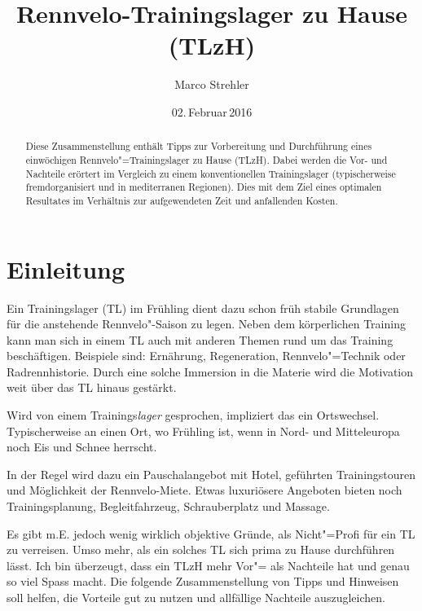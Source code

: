 \documentclass[a4paper,DIV13,BCOR0cm,draft=TRUE]{scrartcl}
\newcommand{\rv}{Rennvelo}
\newcommand{\tlzh}{TLzH}
\newcommand{\Tlzh}{Trainingslager zu Hause}
\begin{document}
\renewcommand*\contentsname{Inhalt} %
\renewcommand*\refname{Quellen} %

\lhead{\tlzh}

\title{\rv-\Tlzh{} (\tlzh)}
\author{Marco Strehler}

\date{02.\,Februar\,2016}

\maketitle

\begin{abstract}
Diese Zusammenstellung enthält Tipps zur Vorbereitung und Durchführung eines einwöchigen \rv"=Trainingslager zu Hause (\tlzh).
Dabei werden die Vor- und Nachteile erörtert im Vergleich zu einem konventionellen Trainingslager
(typischerweise fremdorganisiert und in mediterranen Regionen). 
Dies mit dem Ziel eines optimalen Resultates im Verhältnis zur aufgewendeten Zeit und anfallenden Kosten.
\end{abstract}

\tableofcontents
\section{Einleitung}

Ein Trainingslager (TL) im Frühling dient dazu
schon früh stabile Grundlagen für die anstehende \rv"-Saison zu legen.
Neben dem körperlichen Training kann man sich in einem TL auch mit anderen Themen rund um das Training beschäftigen.
Beispiele sind: Ernährung, Regeneration, \rv"=Technik oder Radrennhistorie.
Durch eine solche Immersion in die Materie wird die Motivation weit über das TL hinaus gestärkt.

Wird von einem Trainings\textsl{lager} gesprochen, impliziert das ein Ortswechsel.
Typischerweise an einen Ort, wo Frühling ist, wenn in Nord- und Mitteleuropa noch Eis und Schnee herrscht.

In der Regel wird dazu ein Pauschalangebot mit Hotel, geführten Trainingstouren und Möglichkeit der \rv-Miete.
Etwas luxuriösere Angeboten bieten noch Trainingsplanung, Begleitfahrzeug, Schrauberplatz und Massage.

Es gibt m.E. jedoch wenig wirklich objektive Gründe, als Nicht"=Profi für ein TL zu verreisen.
Umso mehr, als ein solches TL sich prima zu Hause durchführen lässt.
Ich bin überzeugt, dass ein \tlzh{} mehr Vor"= als Nachteile hat und genau so viel Spass macht.
Die folgende Zusammenstellung von Tipps und Hinweisen soll helfen, die Vorteile gut zu nutzen und allfällige Nachteile
auszugleichen.
\end{document}
